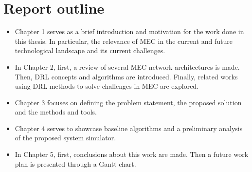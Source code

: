 \clearpage

\section{Report outline}
\begin{itemize}
    \item Chapter 1 serves as a brief introduction and motivation for the work done in this thesis. In particular, the relevance of \acrshort{MEC} in the current and future technological landscape and its current challenges.
    \item In Chapter 2, first, a review of several \acrshort{MEC} network architectures is made. Then, \acrshort{DRL} concepts  and  algorithms  are  introduced. Finally, related works using \acrshort{DRL} methods to solve challenges in \acrshort{MEC} are explored.
    \item Chapter 3 focuses on defining the problem statement, the proposed solution and the methods and tools.
    \item Chapter 4 serves to showcase baseline algorithms and a preliminary analysis of the proposed system simulator. 
    \item In Chapter 5, first, conclusions about this work are made. Then a future work plan is presented through a Gantt chart.
\end{itemize}







 





